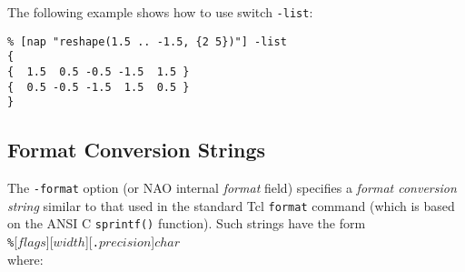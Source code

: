   

The following example shows how to use switch 
  \texttt{-list}:
  \begin{verbatim}
% [nap "reshape(1.5 .. -1.5, {2 5})"] -list
{
{  1.5  0.5 -0.5 -1.5  1.5 }
{  0.5 -0.5 -1.5  1.5  0.5 }
}
\end{verbatim}

\subsection{Format Conversion Strings}
    \label{ooc-data-format-strings}

The 
  \texttt{-format} option (or NAO internal 
  \emph{format} field) specifies a 
  \emph{format conversion string} similar to that used in the standard
  Tcl 
  \texttt{format} command (which is based on the ANSI C 
  \texttt{sprintf()} function). Such strings have the form
  \\
  \texttt{\%}[$flags$][$width$][\texttt{.}$precision$]$char$
  \\where:
